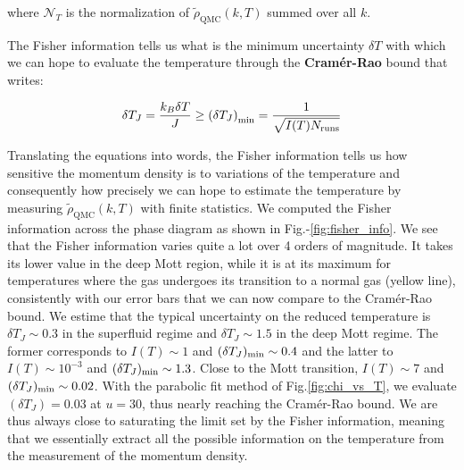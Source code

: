 \noindent where $\mathcal{N}_{T}$ is the normalization of $\tilde{\rho}_{\mathrm{QMC}}(k, T)$ summed over all $k$.

The Fisher information tells us what is the minimum uncertainty $\delta T$ with which we can hope to evaluate the temperature through the \textbf{Cramér-Rao} bound that writes:

\begin{equation}
    \delta T_{J}=\frac{k_{B} \delta T}{J} \geq\left(\delta T_{J}\right)_{\min }=\frac{1}{\sqrt{I(T) N_{\rm{runs}}}}
\end{equation}

\noindent Translating the equations into words, the Fisher information tells us how sensitive the momentum density is to variations of the temperature and consequently how precisely we can hope to estimate the temperature by measuring  $\tilde{\rho}_{\mathrm{QMC}}(k, T)$ with finite statistics. We computed the Fisher information across the phase diagram as shown in Fig.-\ref{fig:fisher_info}. We see that the Fisher information varies quite a lot over 4 orders of magnitude. It takes its lower value in the deep Mott region, while it is at its maximum for temperatures where the gas undergoes its transition to a normal gas (yellow line), consistently with our error bars that we can now compare to the Cramér-Rao bound. We estime that the typical uncertainty on the reduced temperature is $\delta T_J  \sim 0.3$ in the superfluid regime and $\delta T_J  \sim 1.5$ in the deep Mott regime. The former corresponds to $I(T) \sim 1$ and $(\delta T_J)_{\rm{min}} \sim 0.4$ and the latter to  $I(T) \sim 10^{-3}$ and $(\delta T_J)_{\rm{min}} \sim 1.3$. Close to the Mott transition, $I(T) \sim 7$ and $(\delta T_J)_{\rm{min}} \sim 0.02$. With the parabolic fit method of Fig.\ref{fig:chi_vs_T}, we evaluate $(\delta T_J)=0.03$ at $u=30$, thus nearly reaching the Cramér-Rao bound. We are thus always close to saturating the limit set by the Fisher information, meaning that we essentially extract all the possible information on the temperature from the measurement of the momentum density.

